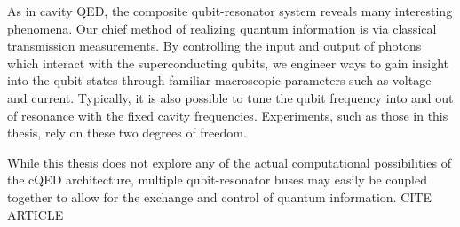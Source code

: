 \documentclass[12 pt]{book}
\begin{document}
As in cavity QED, the composite qubit-resonator system reveals many interesting phenomena. Our chief method of realizing quantum information is via classical transmission measurements. By controlling the input and output of photons which interact with the superconducting qubits, we engineer ways to gain insight into the qubit states through familiar macroscopic parameters such as voltage and current. Typically, it is also possible to tune the qubit frequency into and out of resonance with the fixed cavity frequencies. Experiments, such as those in this thesis, rely on these two degrees of freedom. 

While this thesis does not explore any of the actual computational possibilities of the cQED architecture, multiple qubit-resonator buses may easily be coupled together to allow for the exchange and control of quantum information. CITE ARTICLE






%



\end{document}
